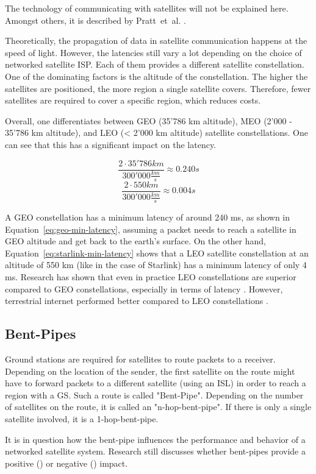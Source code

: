 The technology of communicating with satellites will not be explained here.
Amongst others, it is described by Pratt~et~al. \cite{pratt2019satellite}.

Theoretically, the propagation of data in satellite communication happens at
the speed of light. However, the latencies still vary a lot depending on the
choice of networked satellite ISP. Each of them provides a different satellite
constellation. One of the dominating factors is the altitude of the
constellation. The higher the satellites are positioned, the more region a
single satellite covers. Therefore, fewer satellites are required to cover a
specific region, which reduces costs.

Overall, one differentiates between \ac{GEO} (35'786 km altitude), \ac{MEO}
(2'000 - 35'786 km altitude), and \ac{LEO} (< 2'000 km altitude) satellite
constellations. One can see that this has a significant impact on the latency.

\begin{equation}
	\frac{2 \cdot 35'786 km}{300'000 \frac{km}{s}} \approx 0.240 s
	\label{eq:geo-min-latency}
\end{equation}
\begin{equation}
	\frac{2 \cdot 550 km}{300'000 \frac{km}{s}} \approx 0.004 s
	\label{eq:starlink-min-latency}
\end{equation}

A \ac{GEO} constellation has a minimum latency of around 240 ms, as shown in
Equation~\ref{eq:geo-min-latency}, assuming a packet needs to reach a satellite
in GEO altitude and get back to the earth's surface. On the other hand,
Equation~\ref{eq:starlink-min-latency} shows that a \ac{LEO} satellite
constellation at an altitude of 550 km (like in the case of Starlink) has a
minimum latency of only 4 ms. Research has shown that even in practice \ac{LEO}
constellations are superior compared to \ac{GEO} constellations, especially in
terms of latency \cite{DBLP:journals/pacmnet/RamanVCSZ23, Segan2020}. However,
terrestrial internet performed better compared to \ac{LEO} constellations
\cite{DBLP:conf/www/MohanFCBRMO24, DBLP:conf/infocom/MaCZCML23}.

\subsection{Bent-Pipes} \label{sec:bent-pipes}

Ground stations are required for satellites to route packets to a receiver.
Depending on the location of the sender, the first satellite on the route might
have to forward packets to a different satellite (using an \ac{ISL}) in order
to reach a region with a \ac{GS}. Such a route is called "Bent-Pipe". Depending
on the number of satellites on the route, it is called an "n-hop-bent-pipe". If
there is only a single satellite involved, it is a 1-hop-bent-pipe.

It is in question how the bent-pipe influences the performance and behavior of
a networked satellite system. Research still discusses whether bent-pipes
provide a positive (\cite{Hauri2020}) or negative
(\cite{DBLP:conf/www/MohanFCBRMO24}) impact.

